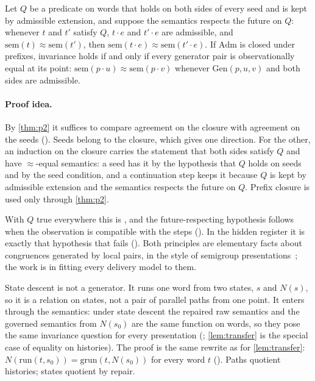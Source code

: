 \begin{theorem}\label{thm:p1}
Let $Q$ be a predicate on words that holds on both sides of every seed and is kept by admissible
extension, and suppose the semantics respects the future on $Q$: whenever $t$ and $t'$ satisfy $Q$,
$t \cdot e$ and $t' \cdot e$ are admissible, and $\mathrm{sem}(t) \approx \mathrm{sem}(t')$, then
$\mathrm{sem}(t \cdot e) \approx \mathrm{sem}(t' \cdot e)$. If $\mathrm{Adm}$ is closed under
prefixes, invariance holds if and only if every generator pair is observationally equal at its
point: $\mathrm{sem}(p \cdot u) \approx \mathrm{sem}(p \cdot v)$ whenever $\mathrm{Gen}(p, u, v)$ and both
sides are admissible.
\end{theorem}

\paragraph{Proof idea.}
By \cref{thm:p2} it suffices to compare agreement on the closure with agreement on the seeds
(). Seeds belong to the closure, which gives one direction. For the other, an
induction on the closure carries the statement that both sides satisfy $Q$ and have
$\approx$-equal semantics: a seed has it by the hypothesis that $Q$ holds on seeds and by the seed
condition, and a continuation step keeps it because $Q$ is kept by admissible extension and the
semantics respects the future on $Q$. Prefix closure is used only through \cref{thm:p2}.

With $Q$ true everywhere this is , and the future-respecting hypothesis follows
when the observation is compatible with the steps (). In the hidden register it is
exactly that hypothesis that fails (). Both principles are elementary facts about
congruences generated by local pairs, in the style of semigroup presentations~\cite{howie1995}; the
work is in fitting every delivery model to them.

State descent is not a generator. It runs one word from two states, $s$ and $N(s)$, so it is a
relation on states, not a pair of parallel paths from one point. It enters through the semantics:
under state descent the repaired raw semantics and the governed semantics from $N(s_0)$ are the same
function on words, so they pose the same invariance question for every presentation
(; \cref{lem:transfer} is the special case of equality on histories).
The proof is the same rewrite as for \cref{lem:transfer}: $N(\mathrm{run}(t, s_0)) =
\mathrm{grun}(t, N(s_0))$ for every word $t$ ().
Paths quotient histories; states quotient by repair.

